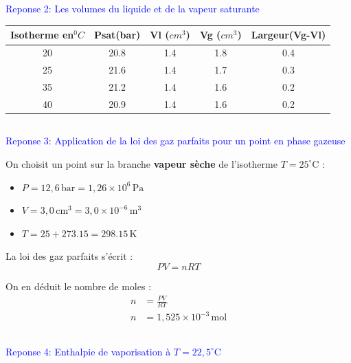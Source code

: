 		
	\subsection*{}
	\textcolor{blue}{Reponse 2: Les volumes du liquide et de la vapeur saturante}\\
	
		\begin{tabular}{|c|c|c|c|c|}\hline
			Isotherme en$ ^0 C$ & Psat(bar)  & Vl ($cm^3$) & Vg ($cm^3$) & Largeur(Vg-Vl) \\ \hline
			20 & 20.8   & 1.4  &  1.8 & 0.4   \\ \hline
			25 & 21.6   & 1.4  &  1.7 & 0.3   \\ \hline
			35 & 21.2   & 1.4  &  1.6 & 0.2   \\ \hline
			40 & 20.9   & 1.4  &  1.6 & 0.2   \\ \hline
		\end{tabular}
		
		
		
	\subsection*{}
	\textcolor{blue}{Reponse 3: Application de la loi des gaz parfaits pour un point en phase gazeuse }
	
		
		
		On choisit un point sur la branche \textbf{vapeur sèche} de l'isotherme $T = 25^\circ$C :
		
		\begin{itemize}
			\item $P = 12,6 \, \text{bar} = 1,26 \times 10^6 \, \text{Pa}$
			\item $V = 3,0 \, \text{cm}^3 = 3,0 \times 10^{-6} \, \text{m}^3$
			\item $T = 25 + 273.15 = 298.15 \, \text{K}$
		\end{itemize}
		
		La loi des gaz parfaits s'écrit :
		\begin{equation}
			PV = nRT
		\end{equation}
		
		On en déduit le nombre de moles :
		\begin{align}
			n &= \frac{PV}{RT} \\
			n &= 1,525 \times 10^{-3} \, \text{mol}
		\end{align}
		
	
	
	\subsection*{}	
	\textcolor{blue}{Reponse 4: Enthalpie de vaporisation à $T = 22,5^\circ$C}
		
